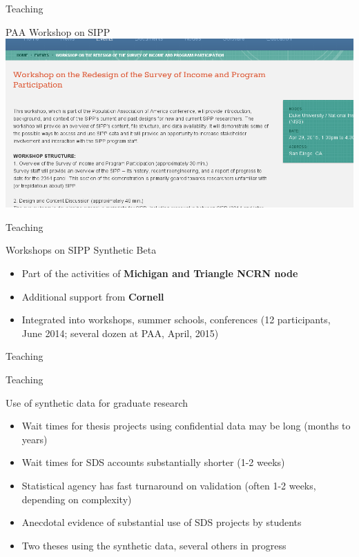 \begin{frame}{Teaching}
\begin{block}{PAA Workshop on SIPP}
\href{http://www.ncrn.info/event/workshop-redesign-survey-income-and-program-participation}{\includegraphics[height=0.6\textheight]{Selection_088.png}}
\end{block}
\end{frame}

\begin{frame}{Teaching}
\begin{block}{Workshops on SIPP Synthetic Beta}
\begin{itemize}
\item Part of the activities of {\bf Michigan and Triangle NCRN node}
\item Additional support from {\bf Cornell}
\item Integrated into workshops, summer schools, conferences (12 participants, June 2014; 
several dozen at  PAA, April, 2015)
\end{itemize}
\end{block}
\end{frame}


\begin{frame}{Teaching}


\end{frame}



\begin{frame}{Teaching}

\begin{block}{Use of synthetic data for graduate research}
\begin{itemize}
\item Wait times for thesis projects using confidential data may be long (months to years)
\item Wait times for SDS accounts substantially shorter (1-2 weeks)
\item Statistical agency has fast turnaround on validation (often 1-2 weeks, depending on 
complexity)
\item Anecdotal evidence of substantial use of SDS projects by students
\item Two theses using the synthetic data, several others in progress
\end{itemize}
\end{block}
\end{frame}





